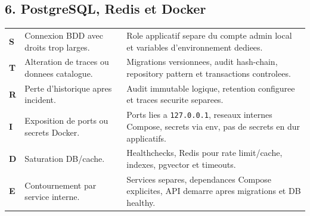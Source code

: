 \documentclass[10pt,a4paper]{article}
\begin{document}
\subsection{6. PostgreSQL, Redis et Docker}
\begin{tabularx}{\textwidth}{@{}L{1.6cm}L{4.2cm}Y@{}}
\toprule
\textbf{S} & Connexion BDD avec droits trop larges. & Role applicatif separe du compte admin local et variables d'environnement dediees. \\
\textbf{T} & Alteration de traces ou donnees catalogue. & Migrations versionnees, audit hash-chain, repository pattern et transactions controlees. \\
\textbf{R} & Perte d'historique apres incident. & Audit immutable logique, retention configuree et traces securite separees. \\
\textbf{I} & Exposition de ports ou secrets Docker. & Ports lies a \texttt{127.0.0.1}, reseaux internes Compose, secrets via env, pas de secrets en dur applicatifs. \\
\textbf{D} & Saturation DB/cache. & Healthchecks, Redis pour rate limit/cache, indexes, pgvector et timeouts. \\
\textbf{E} & Contournement par service interne. & Services separes, dependances Compose explicites, API demarre apres migrations et DB healthy. \\
\bottomrule
\end{tabularx}

\newpage
\end{document}
